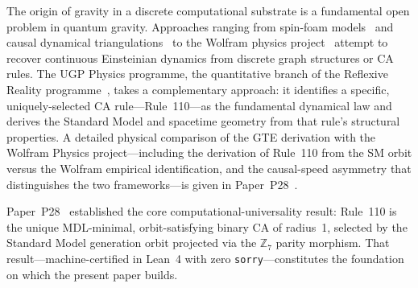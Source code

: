 \documentclass[11pt]{article}
\theoremstyle{remark}
\begin{document}
The origin of gravity in a discrete computational substrate is a fundamental
open problem in quantum gravity.
Approaches ranging from spin-foam models~\cite{Perez2013} and causal
dynamical triangulations~\cite{Ambjorn2012} to the Wolfram physics
project~\cite{Gorard2020Rel} attempt to recover continuous Einsteinian
dynamics from discrete graph structures or CA rules.
The UGP Physics programme, the quantitative branch of the Reflexive Reality
programme~\cite{SpivackResearchProgrammes}, takes a complementary
approach: it identifies a specific, uniquely-selected CA rule---Rule~110---as
the fundamental dynamical law and derives the Standard Model and spacetime
geometry from that rule's structural properties.
A detailed physical comparison of the GTE derivation with the Wolfram Physics
project---including the derivation of Rule~110 from the SM orbit versus the
Wolfram empirical identification, and the causal-speed asymmetry that distinguishes
the two frameworks---is given in Paper~P28~\cite{SpivackCompUniversality}.

Paper~P28~\cite{SpivackCompUniversality} established the core
computational-universality result:
Rule~110 is the unique MDL-minimal, orbit-satisfying binary CA of radius~1,
selected by the Standard Model generation orbit projected via the $\mathbb{Z}_7$
parity morphism.
That result---machine-certified in Lean~4 with zero \texttt{sorry}---constitutes
the foundation on which the present paper builds.
\end{document}
